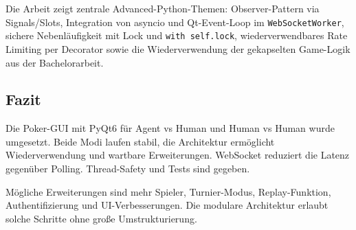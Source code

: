 Die Arbeit zeigt zentrale Advanced-Python-Themen: Observer-Pattern via Signals/Slots, Integration von asyncio und Qt-Event-Loop im \texttt{WebSocketWorker}, sichere Nebenläufigkeit mit Lock und \texttt{with self.lock}, wiederverwendbares Rate Limiting per Decorator sowie die Wiederverwendung der gekapselten Game-Logik aus der Bachelorarbeit.

\subsection{Fazit}

Die Poker-GUI mit PyQt6 für Agent vs Human und Human vs Human wurde umgesetzt. Beide Modi laufen stabil, die Architektur ermöglicht Wiederverwendung und wartbare Erweiterungen.
WebSocket reduziert die Latenz gegenüber Polling. Thread-Safety und Tests sind gegeben.

Mögliche Erweiterungen sind mehr Spieler, Turnier-Modus, Replay-Funktion, Authentifizierung und UI-Verbesserungen. Die modulare Architektur erlaubt solche Schritte ohne große Umstrukturierung.

